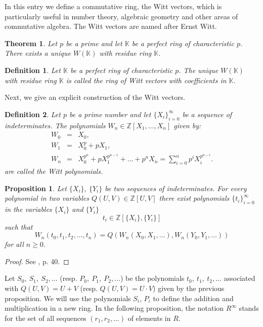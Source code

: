 \documentclass[12pt]{article}
\newtheorem{thm}{Theorem}
\newtheorem{defn}{Definition}
\newtheorem{prop}{Proposition}
\theoremstyle{definition}
\newcommand{\Ints}{\mathbb{Z}}
\begin{document}
In this entry we define a commutative ring, the Witt vectors, which is particularly useful in number theory, algebraic geometry and other areas of commutative algebra. The Witt vectors are named after Ernst Witt.

\begin{thm}
Let $p$ be a prime and let $\mathbb{K}$ be a perfect ring of characteristic $p$. There exists a unique  $W(\mathbb{K})$ with residue ring $\mathbb{K}$. 
\end{thm}

\begin{defn}
Let $\mathbb{K}$ be a perfect ring of characteristic $p$. The unique  $W(\mathbb{K})$ with residue ring $\mathbb{K}$ is called the ring of Witt vectors with coefficients in $\mathbb{K}$.
\end{defn}

Next, we give an explicit construction of the Witt vectors.

\begin{defn}
Let $p$ be a prime number and let $\{ X_i\}_{i=0}^\infty$ be a sequence of indeterminates. The polynomials $W_n\in\Ints[X_1,\ldots,X_n]$ given by:
\begin{eqnarray*}
W_0 &=& X_0,\\
W_1 &=& X_0^p+pX_1,\\
W_n &=& X_0^{p^n}+pX_1^{p^{n-1}}+\ldots+p^nX_n=\sum_{i=0}^n p^iX_i^{p^{n-i}}.
\end{eqnarray*}
are called the Witt polynomials.
\end{defn}

\begin{prop}
Let $\{X_i\},\ \{Y_i\}$ be two sequences of indeterminates. For every polynomial in two variables $Q(U,V)\in \Ints[U,V]$ there exist polynomials $\{t_i\}_{i=0}^\infty$ in the variables $\{X_i\}$ and $\{Y_i\}$
$$t_i \in \Ints[\{X_i\},\{Y_i\}]$$
such that
$$W_n(t_0,t_1,t_2,\ldots,t_n)=Q(W_n(X_0,X_1,\ldots),W_n(Y_0,Y_1,\ldots))$$
for all $n\geq 0$.
\end{prop}
\begin{proof}
See \cite{serre}, p. 40.
\end{proof}

Let $S_0,\ S_1,\ S_2,\ldots$ (resp. $P_0,\ P_1,\ P_2,\ldots$) be the polynomials 
$t_0,\ t_1,\ t_2,\ldots$ associated with $Q(U,V)=U+V$ (resp. $Q(U,V)=U\cdot V$) given by the previous proposition. We will use the polynomials $S_i$, $P_i$ to define the addition and multiplication in a new ring. In the following proposition, the notation $R^\infty$ stands for the set of all sequences $(r_1,r_2,\ldots)$ of elements in $R$.
\end{document}
